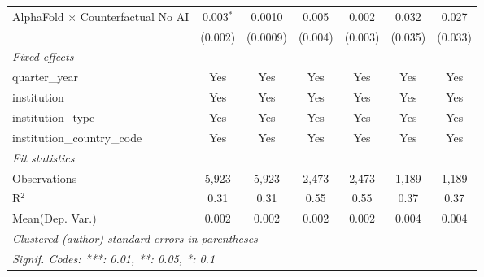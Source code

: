 \begin{tabular}{lcccccc}
   AlphaFold $\times$ Counterfactual No AI  & 0.003$^{*}$ & 0.0010   & 0.005   & 0.002    & 0.032   & 0.027\\   
                                            & (0.002)     & (0.0009) & (0.004) & (0.003)  & (0.035) & (0.033)\\   
   \midrule
   \emph{Fixed-effects}\\
   quarter\_year                            & Yes         & Yes      & Yes     & Yes      & Yes     & Yes\\  
   institution                              & Yes         & Yes      & Yes     & Yes      & Yes     & Yes\\  
   institution\_type                        & Yes         & Yes      & Yes     & Yes      & Yes     & Yes\\  
   institution\_country\_code               & Yes         & Yes      & Yes     & Yes      & Yes     & Yes\\  
   \midrule
   \emph{Fit statistics}\\
   Observations                             & 5,923       & 5,923    & 2,473   & 2,473    & 1,189   & 1,189\\  
   R$^2$                                    & 0.31        & 0.31     & 0.55    & 0.55     & 0.37    & 0.37\\  
Mean(Dep. Var.) & 0.002 & 0.002 & 0.002 & 0.002 & 0.004 & 0.004 \\
   \midrule \midrule
   \multicolumn{7}{l}{\emph{Clustered (author) standard-errors in parentheses}}\\
   \multicolumn{7}{l}{\emph{Signif. Codes: ***: 0.01, **: 0.05, *: 0.1}}\\
\end{tabular}
\par\endgroup
